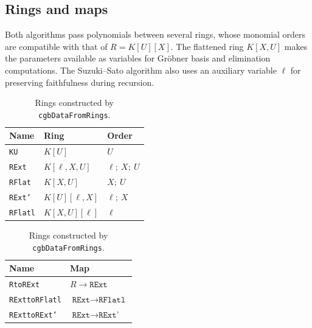 \documentclass[11pt]{amsart}
\theoremstyle{plain}
\theoremstyle{definition}
\theoremstyle{remark}
\begin{document}
\subsection{Rings and maps}

Both algorithms pass polynomials between several rings, whose monomial orders are compatible with that of $R=K[U][X]$.
The flattened ring $K[X,U]$ makes the parameters available as variables for Gröbner basis and elimination computations.
The Suzuki--Sato algorithm also uses an auxiliary variable $\ell$ for preserving faithfulness during recursion.

\begin{table}[htbp]
    \centering
    \begin{minipage}[t]{0.46\textwidth}
        \vspace{0pt}
        \centering
        \small
        \setlength{\tabcolsep}{4pt}
        \begin{tabular}{lll}
            \hline
            Name & Ring & Order \\
            \hline
            \texttt{KU}
                & $K[U]$ & $U$ \\
            \texttt{RExt}
                & $K[\ell,X,U]$ & $\ell;\ X;\ U$ \\
            \texttt{RFlat}
                & $K[X,U]$ & $X;\ U$ \\
            \texttt{RExt'}
                & $K[U][\ell,X]$ & $\ell;\ X$ \\
            \texttt{RFlatl}
                & $K[X,U][\ell]$ & $\ell$ \\
            \hline
        \end{tabular}
        \caption{Rings constructed by
        \texttt{cgbDataFromRings}.}
        \label{tab:cgb-rings}
    \end{minipage}\hfill%
    \begin{minipage}[t]{0.52\textwidth}
        \vspace{0pt}
        \centering
        \small
        \setlength{\tabcolsep}{4pt}
        \begin{tabular}{ll}
            \hline
            Name & Map \\
            \hline
            \texttt{RtoRExt}
                & $R \to \texttt{RExt}$ \\
            \texttt{RExttoRFlatl}
                & $\texttt{RExt} \to \texttt{RFlatl}$ \\
            \texttt{RExttoRExt'}
                & $\texttt{RExt} \to \texttt{RExt'}$ \\

\end{tabular}
\end{minipage}
\end{table}
\end{document}
